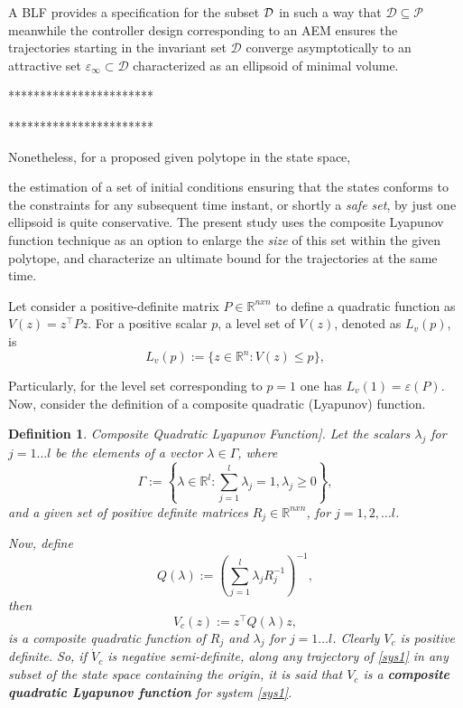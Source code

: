 \documentclass[journal,twocolumn]{IEEEtran}
\newtheorem{definition}{Definition}
\begin{document}
A BLF provides a specification for the subset ${\cal D}$ in such a way that $\mathcal{D} \subseteq \mathcal{P}$ meanwhile the controller design corresponding to an AEM ensures the trajectories starting in the invariant set $\mathcal{D}$ converge asymptotically to an attractive set $\varepsilon_{\infty} \subset \mathcal{D}$ characterized as an ellipsoid of minimal volume. 


 
***********************

***********************



Nonetheless, for a proposed given polytope in the state space, 


the estimation of a set of initial conditions ensuring that the states conforms to the constraints for any subsequent time instant, or shortly a {\it safe set}, by just one ellipsoid is quite conservative. The present study uses the composite Lyapunov function technique \cite{tingshu} as an option to enlarge the \textit{size} of this set within the given polytope, and characterize an ultimate bound for the trajectories at the same time. 

Let consider a positive-definite matrix $P\in\mathbb{R}^{nxn}$ to define a quadratic function as $V(z)=z^{\top}Pz$. For a positive scalar $p$, a level set of $V(z)$, denoted as $L_v(p)$, is
%
\begin{equation*}
    L_v(p):=\lbrace z\in\mathbb{R}^n : V(z)\leq p\rbrace, 
\end{equation*}

Particularly, for the level set corresponding to $p=1$ one has $L_v(1)=\varepsilon(P)$.
Now, consider the definition of a composite quadratic (Lyapunov) function.
\begin{definition}Composite Quadratic Lyapunov Function]\cite{tingshu}.  Let the scalars $\lambda_j$ for $j=1\dots l$ be the elements of a vector $\lambda\in \Gamma$, where
\begin{equation}
 \Gamma:=\left\lbrace\lambda\in\mathbb{R}^l :  \sum_{j=1}^l \lambda_j=1,\lambda_j\geq 0\right\rbrace,
\end{equation}
and a given set of positive definite matrices $R_j \in \mathbb{R}^{nxn}$, for $j=1,2,\dots l$. 

Now, define 
 \begin{equation}\label{convexhuldef}
     Q(\lambda):=\left(\sum_{j=1}^{l}\lambda_jR^{-1}_j\right)^{-1},
 \end{equation}
%
then 
\begin{equation}\label{composite}
  V_c(z) := z^\top Q(\lambda)z,
\end{equation}
 is a composite quadratic function of $R_j$ and $\lambda_j$ for $j=1\dots l$. Clearly $V_c$ is positive definite. So, if $\dot{V}_c$ is negative semi-definite, along any trajectory of \eqref{sys1} in any subset of the state space containing the origin, it is said that $V_c$ is a {\bf  composite quadratic Lyapunov function} for system \eqref{sys1}.
 \end{definition}
\end{document}
